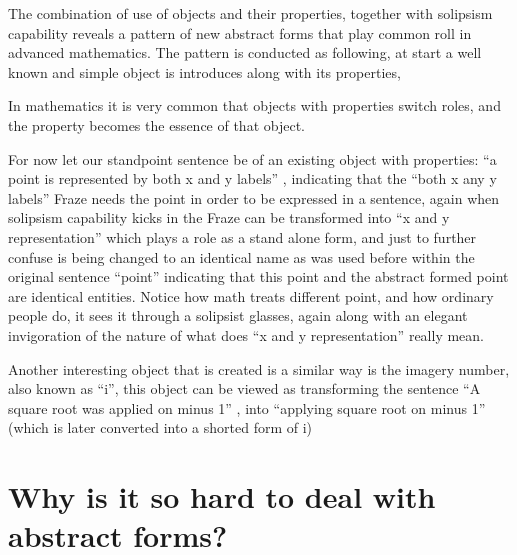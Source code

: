 \documentclass[10pt]{article}
\begin{document}
The combination of use of objects and their properties, together with solipsism capability reveals a  pattern of new abstract forms that play common roll in advanced mathematics. The pattern is conducted as following, at start a well known and simple object is introduces along with its properties,\par
In mathematics it is very common that objects with properties switch roles, and the property becomes the essence of that object.\par
For now let our standpoint sentence be of an existing object with properties: “a point is represented by  both x and y labels” , indicating that the “both x any y labels” Fraze needs the point in order to be expressed in a sentence, again when solipsism capability kicks in  the Fraze can be transformed into “x and y representation”  which plays a role as a stand alone form, and just to further confuse is being changed to an identical name as was used before within the original sentence “point”  indicating that this point and the abstract formed point are identical entities.  Notice how math treats different point, and how ordinary people do, it sees it through a solipsist glasses, again  along with an elegant invigoration of the nature of what does “x and y representation” really mean.\par

Another interesting object that is created is a similar way is the imagery number, also known as “i”, this object can be viewed as transforming the sentence “A square root was applied on minus 1” , into “applying  square root  on minus 1” (which is later converted into a shorted form of i)

\newpage 
\section*{Why is it so hard to deal with abstract forms?}
\end{document}
